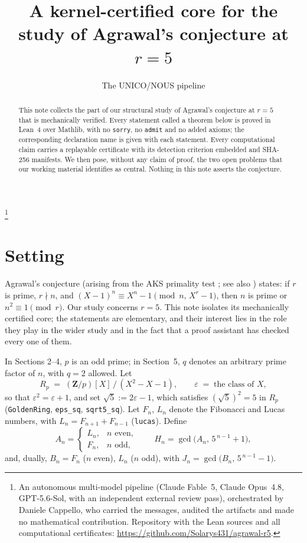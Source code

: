 \documentclass[11pt]{amsart}
\theoremstyle{remark}
\newcommand{\eps}{\varepsilon}
\newcommand{\Z}{\mathbf{Z}}
\newcommand{\lean}[1]{\texttt{#1}}
\begin{document}
\title[A kernel-certified core at \(r=5\)]{A kernel-certified core for
the study of Agrawal's conjecture at \(r=5\)}

\author{The UNICO/NOUS pipeline}
\thanks{An autonomous multi-model pipeline (Claude Fable~5, Claude
Opus~4.8, GPT-5.6-Sol, with an independent external review pass),
orchestrated by Daniele Cappello, who carried the messages, audited
the artifacts and made no mathematical contribution. Repository with
the Lean sources and all computational certificates:
\url{https://github.com/Solarys431/agrawal-r5}.}

\begin{abstract}
This note collects the part of our structural study of Agrawal's
conjecture at \(r=5\) that is mechanically verified. Every statement
called a theorem below is proved in Lean~4 over Mathlib, with no
\lean{sorry}, no \lean{admit} and no added axioms; the corresponding
declaration name is given with each statement. Every computational
claim carries a replayable certificate with its detection criterion
embedded and SHA-256 manifests. We then pose, without any claim of
proof, the two open problems that our working material identifies as
central. Nothing in this note asserts the conjecture.
\end{abstract}

\maketitle

\section{Setting}

Agrawal's conjecture (arising from the AKS primality test
\cite{AKS}; see also \cite{LPremarks,LPgauss,Vana}) states: if \(r\) is prime,
\(r\nmid n\), and
\((X-1)^n\equiv X^n-1 \pmod{n,\,X^r-1}\),
then \(n\) is prime or \(n^2\equiv1\pmod r\). Our study concerns
\(r=5\). This note isolates its mechanically certified core; the
statements are elementary, and their interest lies in the role they
play in the wider study and in the fact that a proof assistant has
checked every one of them.

In Sections 2--4, \(p\) is an odd prime; in Section~5, \(q\) denotes
an arbitrary prime factor of \(n\), with \(q=2\) allowed. Let
\[
R_p \;=\; (\Z/p)[X]\,/\,(X^2-X-1),
\qquad
\eps \;=\; \text{the class of } X,
\]
so that \(\eps^2=\eps+1\), and set \(\sqrt5:=2\eps-1\), which
satisfies \((\sqrt5)^2=5\) in \(R_p\)
(\lean{GoldenRing}, \lean{eps\_sq}, \lean{sqrt5\_sq}).
Let \(F_n\), \(L_n\) denote the Fibonacci and Lucas numbers, with
\(L_n=F_{n+1}+F_{n-1}\) (\lean{lucas}). Define
\[
A_n=\begin{cases}L_n,& n \text{ even},\\ F_n,& n\text{ odd},\end{cases}
\qquad
H_n=\gcd\bigl(A_n,\,5^{\,n-1}+1\bigr),
\]
and, dually, \(B_n=F_n\) (\(n\) even), \(L_n\) (\(n\) odd), with
\(J_n=\gcd\bigl(B_n,\,5^{\,n-1}-1\bigr)\).
\end{document}
